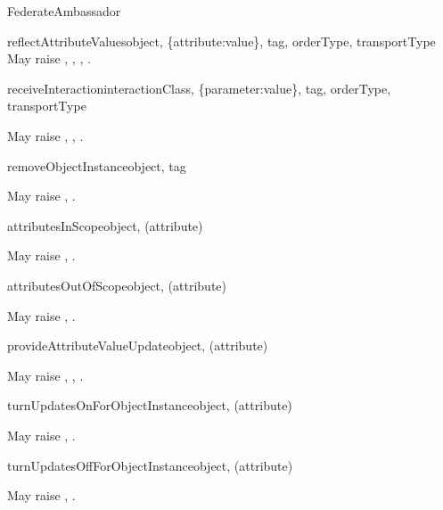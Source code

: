 \begin{classdesc}{FederateAmbassador}{}
\begin{methoddesc}{reflectAttributeValues}{object, \{attribute:value\}, tag, orderType, transportType}
May raise
,
,
,
.
\end{methoddesc}

\begin{methoddesc}{receiveInteraction}{interactionClass, \{parameter:value\}, tag, orderType, transportType}

May raise
,
,
.
\end{methoddesc}

\begin{methoddesc}{removeObjectInstance}{object, tag}

May raise
,
.
\end{methoddesc}

\begin{methoddesc}{attributesInScope}{object, (attribute)}

May raise
,
.
\end{methoddesc}

\begin{methoddesc}{attributesOutOfScope}{object, (attribute)}

May raise
,
.
\end{methoddesc}

\begin{methoddesc}{provideAttributeValueUpdate}{object, (attribute)}

May raise
,
,
.
\end{methoddesc}

\begin{methoddesc}{turnUpdatesOnForObjectInstance}{object, (attribute)}

May raise
,
.
\end{methoddesc}

\begin{methoddesc}{turnUpdatesOffForObjectInstance}{object, (attribute)}

May raise
,
.
\end{methoddesc}


\end{classdesc}
